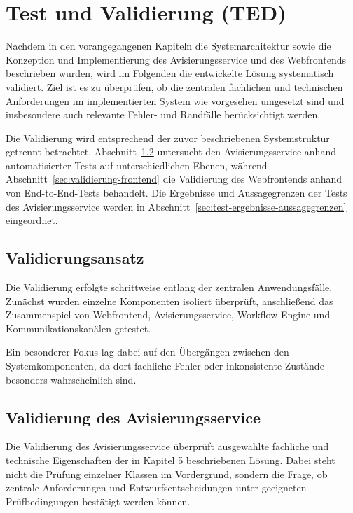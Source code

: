 \section{Test und Validierung (TED)}
\label{sec:test-validierung}

Nachdem in den vorangegangenen Kapiteln die Systemarchitektur sowie die
Konzeption und Implementierung des Avisierungsservice und des Webfrontends
beschrieben wurden, wird im Folgenden die entwickelte Lösung systematisch
validiert. Ziel ist es zu überprüfen, ob die zentralen fachlichen und
technischen Anforderungen im implementierten System wie vorgesehen umgesetzt
sind und insbesondere auch relevante Fehler- und Randfälle berücksichtigt
werden.

Die Validierung wird entsprechend der zuvor beschriebenen Systemstruktur
getrennt betrachtet. Abschnitt~\ref{sec:validierung-avisierungsservice-backend}
untersucht den Avisierungsservice anhand automatisierter Tests auf
unterschiedlichen Ebenen, während
Abschnitt~\ref{sec:validierung-frontend} die Validierung des Webfrontends
anhand von End-to-End-Tests behandelt. Die Ergebnisse und Aussagegrenzen der
Tests des Avisierungsservice werden in
Abschnitt~\ref{sec:test-ergebnisse-aussagegrenzen} eingeordnet.

\subsection{Validierungsansatz}

Die Validierung erfolgte schrittweise entlang der zentralen
Anwendungsfälle. Zunächst wurden einzelne Komponenten isoliert
überprüft, anschließend das Zusammenspiel von Webfrontend,
Avisierungsservice, Workflow Engine und Kommunikationskanälen getestet.

Ein besonderer Fokus lag dabei auf den Übergängen zwischen den
Systemkomponenten, da dort fachliche Fehler oder inkonsistente
Zustände besonders wahrscheinlich sind.

\subsection{Validierung des Avisierungsservice}
\label{sec:validierung-avisierungsservice-backend}

Die Validierung des Avisierungsservice überprüft ausgewählte fachliche und
technische Eigenschaften der in Kapitel 5 beschriebenen Lösung. Dabei steht
nicht die Prüfung einzelner Klassen im Vordergrund, sondern die Frage, ob
zentrale Anforderungen und Entwurfsentscheidungen unter geeigneten
Prüfbedingungen bestätigt werden können.


